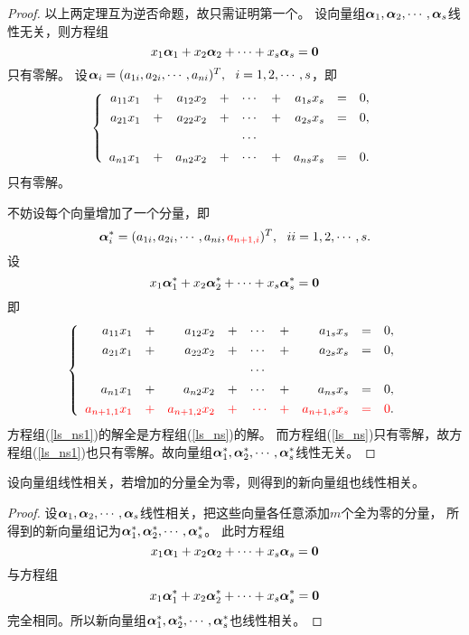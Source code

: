 \begin{frame}[allowframebreaks]
\begin{proof}
以上两定理互为逆否命题，故只需证明第一个。 
设向量组$\boldsymbol{\alpha}_1,\boldsymbol{\alpha}_2,\cdots,\boldsymbol{\alpha}_s$线性无关，则方程组
$$
x_1\alphabd_1+x_2\alphabd_2+\cd+x_s\alphabd_s=\M0
$$
只有零解。 设$\boldsymbol{\alpha}_i=(a_{1i},a_{2i},\cdots,a_{ni})^T,~~ i=1,2,\cdots,s$，即
\begin{equation}\label{ls_ns}
  \left\{
  \begin{array}{rcrcrcrcr}
    a_{11}x_1&+&a_{12}x_2&+&\cdots&+&a_{1s}x_s&=&0,\\[0.05in]
    a_{21}x_1&+&a_{22}x_2&+&\cdots&+&a_{2s}x_s&=&0,\\[0.05in]
    &&&&\cdots&&&&\\[0.05in]
    a_{n1}x_1&+&a_{n2}x_2&+&\cdots&+&a_{ns}x_s&=&0.
  \end{array}
  \right.
\end{equation}
只有零解。


不妨设每个向量增加了一个分量，即
$$
\boldsymbol{\alpha}_i^*= (a_{1i},a_{2i},\cdots,a_{ni},\textcolor{red}{a_{n+1,i}})^T, ~~ ii=1,2,\cdots,s.
$$ 
设
$$
x_1\alphabd_1^*+x_2\alphabd_2^*+\cd+x_s\alphabd_s^*=\M0
$$
即
\begin{equation}\label{ls_ns1}
  \left\{
  \begin{array}{rcrcrcrcr}
    a_{11}x_1&+&a_{12}x_2&+&\cdots&+&a_{1s}x_s&=&0,\\[0.05in]
    a_{21}x_1&+&a_{22}x_2&+&\cdots&+&a_{2s}x_s&=&0,\\[0.05in]
    &&&&\cdots&&&&\\[0.05in]
    a_{n1}x_1&+&a_{n2}x_2&+&\cdots&+&a_{ns}x_s&=&0,\\[0.05in]
    \textcolor{red}{a_{n+1,1}x_1}&\textcolor{red}{+}&\textcolor{red}{a_{n+1,2}x_2}&\textcolor{red}{+}&\textcolor{red}{\cdots}&\textcolor{red}{+}&\textcolor{red}{a_{n+1,s}x_s}&\textcolor{red}{=}&\textcolor{red}{0}.
  \end{array}
  \right.
\end{equation}
方程组(\ref{ls_ns1})的解全是方程组(\ref{ls_ns})的解。 而方程组(\ref{ls_ns})只有零解，故方程组(\ref{ls_ns1})也只有零解。故向量组$\boldsymbol{\alpha}^*_1,\boldsymbol{\alpha}^*_2,\cdots,\boldsymbol{\alpha}^*_s$线性无关。
\end{proof}
\end{frame}

\begin{frame}
\begin{tuilun}
  设向量组线性相关，若增加的分量全为零，则得到的新向量组也线性相关。
\end{tuilun}
\pause 
\begin{proof}
设$\boldsymbol{\alpha}_1,\boldsymbol{\alpha}_2,\cdots,\boldsymbol{\alpha}_s$线性相关，把这些向量各任意添加$m$个全为零的分量，
所得到的新向量组记为$\boldsymbol{\alpha}^*_1,\boldsymbol{\alpha}^*_2,\cdots,\boldsymbol{\alpha}^*_s$。 
此时方程组
$$
x_1\alphabd_1+x_2\alphabd_2+\cd+x_s\alphabd_s=\M0
$$ 
与方程组
$$
x_1\alphabd_1^*+x_2\alphabd_2^*+\cd+x_s\alphabd_s^*=\M0
$$
完全相同。所以新向量组$\boldsymbol{\alpha}^*_1,\boldsymbol{\alpha}^*_2,\cdots,\boldsymbol{\alpha}^*_s$也线性相关。
\end{proof}
\end{frame}

